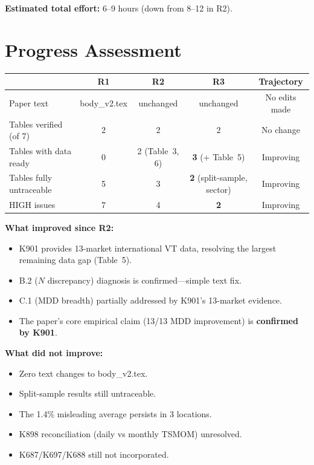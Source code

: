 \documentclass[12pt,a4paper]{article}
\begin{document}
\bigskip
\noindent\textbf{Estimated total effort:} 6--9 hours (down from 8--12 in R2).


\section{Progress Assessment}
\label{sec:progress}

\begin{center}
\begin{tabular}{lcccc}
\toprule
& R1 & R2 & R3 & Trajectory \\
\midrule
Paper text & body\_v2.tex & unchanged & unchanged & No edits made \\
Tables verified (of 7) & 2 & 2 & 2 & No change \\
Tables with data ready & 0 & 2 (Table~3, 6) & \textbf{3} (+ Table~5) & Improving \\
Tables fully untraceable & 5 & 3 & \textbf{2} (split-sample, sector) & Improving \\
HIGH issues & 7 & 4 & \textbf{2} & Improving \\
\bottomrule
\end{tabular}
\end{center}

\noindent\textbf{What improved since R2:}
\begin{itemize}[nosep]
\item K901 provides 13-market international VT data, resolving the largest remaining data gap (Table~5).
\item B.2 ($N$ discrepancy) diagnosis is confirmed---simple text fix.
\item C.1 (MDD breadth) partially addressed by K901's 13-market evidence.
\item The paper's core empirical claim (13/13 MDD improvement) is \textbf{confirmed by K901}.
\end{itemize}

\noindent\textbf{What did not improve:}
\begin{itemize}[nosep]
\item Zero text changes to body\_v2.tex.
\item Split-sample results still untraceable.
\item The 1.4\% misleading average persists in 3 locations.
\item K898 reconciliation (daily vs monthly TSMOM) unresolved.
\item K687/K697/K688 still not incorporated.
\end{itemize}
\end{document}
